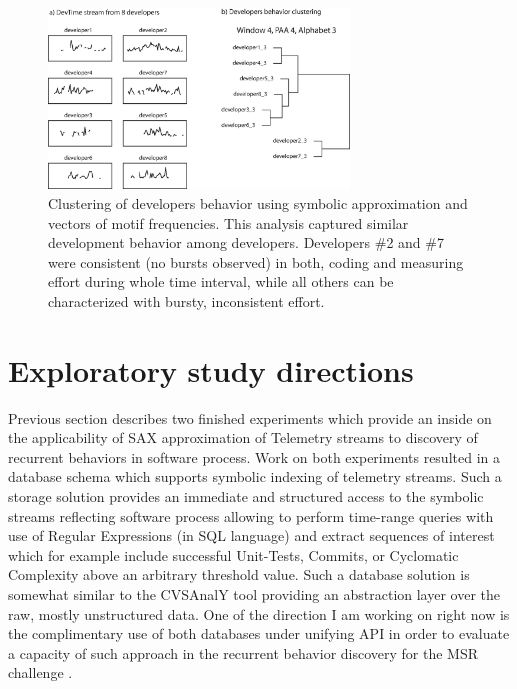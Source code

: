 \documentclass{sig-alternate}
\begin{document}
\begin{figure}[tbp]
   \centering
   \includegraphics[height=48mm]{dev_clustering.eps}
   \caption{Clustering of developers behavior using symbolic approximation and vectors of motif frequencies. This analysis captured similar development behavior among developers. Developers \#2 and \#7 were consistent (no bursts observed) in both, coding and measuring effort during whole time interval, while all others can be characterized with bursty, inconsistent effort.}
   \label{fig:cluster_developers}
\end{figure}

\section{Exploratory study directions}
Previous section describes two finished experiments which provide an inside on the applicability of SAX approximation of Telemetry streams to discovery of recurrent behaviors in software process. Work on both experiments resulted in a database schema which supports symbolic indexing of telemetry streams. Such a storage solution provides an immediate and structured access to the symbolic streams reflecting software process allowing to perform time-range queries with use of Regular Expressions (in SQL language) and extract sequences of interest which for example include successful Unit-Tests, Commits, or Cyclomatic Complexity above an arbitrary threshold value. Such a database solution is somewhat similar to the CVSAnalY tool \cite{citeulike:6544724} providing an abstraction layer over the raw, mostly unstructured data. One of the direction I am working on right now is the complimentary use of both databases under unifying API in order to evaluate a capacity of such approach in the recurrent behavior discovery for the MSR challenge \cite{citeulike:5043676}.
\end{document}
